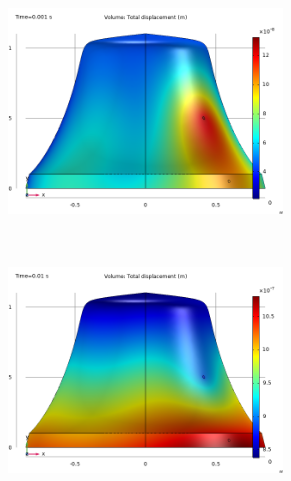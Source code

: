 \documentclass[a4paper]{article}
\begin{document}
\begin{figure}[h!]
	\centering
	\begin{subfigure}{0.47\textwidth}
		\includegraphics[width=0.8\textwidth]{time domain study side/initial time.png}
	\end{subfigure}
	~
	\begin{subfigure}{0.47\textwidth}
		\includegraphics[width=0.8\textwidth]{time domain study side/initial time 2.png}
	\end{subfigure}
	

\end{figure}
\end{document}
